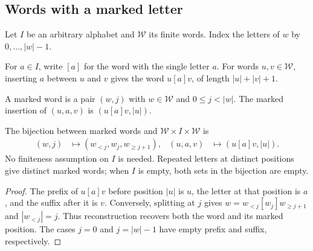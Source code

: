 \subsection{Words with a marked letter}
\label{sec:poisson_word_marked}

Let $I$ be an arbitrary alphabet and $\mathcal W$ its finite words.
Index the letters of $w$ by $0,\ldots,{|w|-1}$.

\begin{definition}
\label{def:poisson_word_insert}
\leanok
{}
For $a\in I$, write $[a]$ for the word with the single letter $a$.
For words $u,v\in\mathcal W$, inserting $a$ between $u$ and $v$
gives the word $u[a]v$, of length $|u|+|v|+1$.
\end{definition}

\begin{definition}
\label{def:poisson_word_marked}
\leanok
{}
A marked word is a pair $(w,j)$ with $w\in\mathcal W$ and $0\leq j<|w|$.
The marked insertion of $(u,a,v)$ is $(u[a]v,|u|)$.
\end{definition}

\begin{definition}
\label{def:poisson_word_marked_equiv}
\leanok
{}
The bijection between marked words and
$\mathcal W\times I\times\mathcal W$ is
\begin{align}
 (w,j)&\longmapsto (w_{<j},w_j,w_{\geq j+1}),
 & (u,a,v)&\longmapsto (u[a]v,|u|).
 \label{eq:poisson_word_marked_equiv}
\end{align}
No finiteness assumption on $I$ is needed.
Repeated letters at distinct positions give distinct marked words;
when $I$ is empty, both sets in the bijection are empty.
\end{definition}
\begin{proof}
\leanok
The prefix of $u[a]v$ before position $|u|$ is $u$, the letter at that
position is $a$, and the suffix after it is $v$.
Conversely, splitting at $j$ gives
$w=w_{<j}[w_j]w_{\geq j+1}$ and $|w_{<j}|=j$.
Thus reconstruction recovers both the word and its marked position.
The cases $j=0$ and $j=|w|-1$ have empty prefix and suffix, respectively.
\end{proof}
